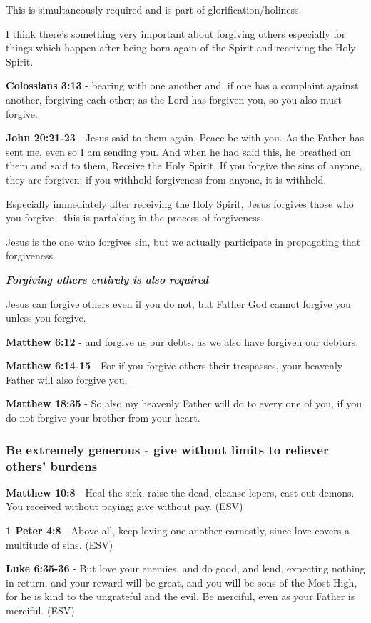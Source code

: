 \documentclass[11pt]{article}
\begin{document}
This is simultaneously required and is part of glorification/holiness.

I think there's something very important about forgiving others especially for things which happen after being born-again of the Spirit and receiving the Holy Spirit.

\textbf{Colossians 3:13} - bearing with one another and, if one has a complaint against another, forgiving each other; as the Lord has forgiven you, so you also must forgive.

\textbf{John 20:21-23} - Jesus said to them again, Peace be with you. As the Father has sent me, even so I am sending you. And when he had said this, he breathed on them and said to them, Receive the Holy Spirit. If you forgive the sins of anyone, they are forgiven; if you withhold forgiveness from anyone, it is withheld.

Especially immediately after receiving the Holy Spirit, Jesus forgives those who you forgive - this is partaking in the process of forgiveness.

Jesus is the one who forgives sin, but we actually participate in propagating that forgiveness.

\emph{\textbf{Forgiving others entirely is also required}}

Jesus can forgive others even if you do not, but Father God cannot forgive you unless you forgive.

\textbf{Matthew 6:12} - and forgive us our debts, as we also have forgiven our debtors.

\textbf{Matthew 6:14-15} - For if you forgive others their trespasses, your heavenly Father will also forgive you,

\textbf{Matthew 18:35} - So also my heavenly Father will do to every one of you, if you do not forgive your brother from your heart.

\subsubsection{Be extremely generous - give without limits to reliever others' burdens}
\label{sec:org1960ef2}
\textbf{Matthew 10:8} - Heal the sick, raise the dead, cleanse lepers, cast out demons. You received without paying; give without pay. (ESV)

\textbf{1 Peter 4:8} - Above all, keep loving one another earnestly, since love covers a multitude of sins. (ESV)

\textbf{Luke 6:35-36} - But love your enemies, and do good, and lend, expecting nothing in return, and your reward will be great, and you will be sons of the Most High, for he is kind to the ungrateful and the evil. Be merciful, even as your Father is merciful. (ESV)
\end{document}
